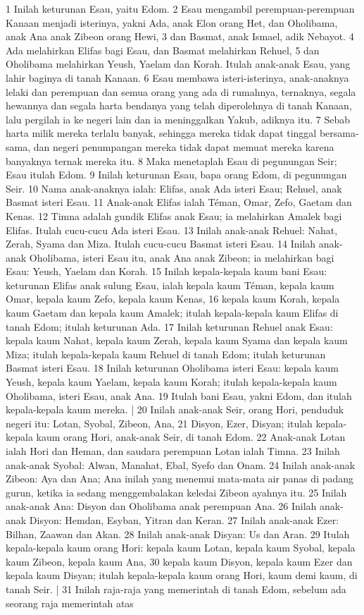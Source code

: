 \begin{biblechapter} %
1 Inilah keturunan Esau, yaitu Edom. 2 Esau mengambil perempuan-perempuan Kanaan menjadi isterinya, yakni Ada, anak Elon orang Het, dan Oholibama, anak Ana anak Zibeon orang Hewi, 3 dan Basmat, anak Ismael, adik Nebayot. 4 Ada melahirkan Elifas bagi Esau, dan Basmat melahirkan Rehuel, 5 dan Oholibama melahirkan Yeush, Yaelam dan Korah. Itulah anak-anak Esau, yang lahir baginya di tanah Kanaan. 6 Esau membawa isteri-isterinya, anak-anaknya lelaki dan perempuan dan semua orang yang ada di rumahnya, ternaknya, segala hewannya dan segala harta bendanya yang telah diperolehnya di tanah Kanaan, lalu pergilah ia ke negeri lain dan ia meninggalkan Yakub, adiknya itu. 7 Sebab harta milik mereka terlalu banyak, sehingga mereka tidak dapat tinggal bersama-sama, dan negeri penumpangan mereka tidak dapat memuat mereka karena banyaknya ternak mereka itu. 8 Maka menetaplah Esau di pegunungan Seir; Esau itulah Edom. 9 Inilah keturunan Esau, bapa orang Edom, di pegunungan Seir. 10 Nama anak-anaknya ialah: Elifas, anak Ada isteri Esau; Rehuel, anak Basmat isteri Esau. 11 Anak-anak Elifas ialah Téman, Omar, Zefo, Gaetam dan Kenas. 12 Timna adalah gundik Elifas anak Esau; ia melahirkan Amalek bagi Elifas. Itulah cucu-cucu Ada isteri Esau. 13 Inilah anak-anak Rehuel: Nahat, Zerah, Syama dan Miza. Itulah cucu-cucu Basmat isteri Esau. 14 Inilah anak-anak Oholibama, isteri Esau itu, anak Ana anak Zibeon; ia melahirkan bagi Esau: Yeush, Yaelam dan Korah. 15 Inilah kepala-kepala kaum bani Esau: keturunan Elifas anak sulung Esau, ialah kepala kaum Téman, kepala kaum Omar, kepala kaum Zefo, kepala kaum Kenas, 16 kepala kaum Korah, kepala kaum Gaetam dan kepala kaum Amalek; itulah kepala-kepala kaum Elifas di tanah Edom; itulah keturunan Ada. 17 Inilah keturunan Rehuel anak Esau: kepala kaum Nahat, kepala kaum Zerah, kepala kaum Syama dan kepala kaum Miza; itulah kepala-kepala kaum Rehuel di tanah Edom; itulah keturunan Basmat isteri Esau. 18 Inilah keturunan Oholibama isteri Esau: kepala kaum Yeush, kepala kaum Yaelam, kepala kaum Korah; itulah kepala-kepala kaum Oholibama, isteri Esau, anak Ana. 19 Itulah bani Esau, yakni Edom, dan itulah kepala-kepala kaum mereka. | 20 Inilah anak-anak Seir, orang Hori, penduduk negeri itu: Lotan, Syobal, Zibeon, Ana, 21 Disyon, Ezer, Disyan; itulah kepala-kepala kaum orang Hori, anak-anak Seir, di tanah Edom. 22 Anak-anak Lotan ialah Hori dan Heman, dan saudara perempuan Lotan ialah Timna. 23 Inilah anak-anak Syobal: Alwan, Manahat, Ebal, Syefo dan Onam. 24 Inilah anak-anak Zibeon: Aya dan Ana; Ana inilah yang menemui mata-mata air panas di padang gurun, ketika ia sedang menggembalakan keledai Zibeon ayahnya itu. 25 Inilah anak-anak Ana: Disyon dan Oholibama anak perempuan Ana. 26 Inilah anak-anak Disyon: Hemdan, Esyban, Yitran dan Keran. 27 Inilah anak-anak Ezer: Bilhan, Zaawan dan Akan. 28 Inilah anak-anak Disyan: Us dan Aran. 29 Itulah kepala-kepala kaum orang Hori: kepala kaum Lotan, kepala kaum Syobal, kepala kaum Zibeon, kepala kaum Ana, 30 kepala kaum Disyon, kepala kaum Ezer dan kepala kaum Disyan; itulah kepala-kepala kaum orang Hori, kaum demi kaum, di tanah Seir. | 31 Inilah raja-raja yang memerintah di tanah Edom, sebelum ada seorang raja memerintah atas 
\end{biblechapter}
